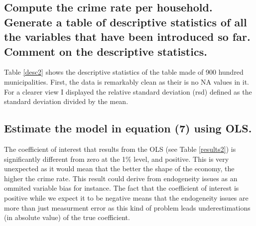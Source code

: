 \subsection{Compute the crime rate per household. Generate a table of descriptive statistics of all the
variables that have been introduced so far. Comment on the descriptive statistics.}

Table \ref{desc2} shows the descriptive statistics of the table made of
900 hundred municipalities. First, the data is remarkably clean as their is no
NA values in it. For a clearer view I displayed the relative standard deviation (rsd)
defined as the standard deviation divided by the mean.
\subsection{Estimate the model in equation (7) using OLS.}

The coefficient of interest that results from the OLS (see Table \ref{results2}) is significantly different from zero at the 1\% level, and positive.
This is very unexpected as it would mean that the better the shape of the economy, the higher the crime rate. This result
could derive from endogeneity issues as an ommited variable bias for instance.
The fact that the coefficient of interest is positive while we expect it to be negative
means that the endogeneity issues are more than just measurment error as this kind of
problem leads underestimations (in absolute value) of the true coefficient.

